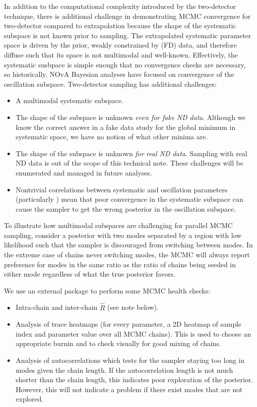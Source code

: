 \documentclass{article}
\begin{document}
In addition to the computational complexity introduced by the two-detector technique, there is additional challenge in demonstrating MCMC convergence for two-detector compared to extrapolation because the shape of the systematic subspace is not known prior to sampling. The extrapolated systematic parameter space is driven by the prior, weakly constrained by (FD) data, and therefore diffuse such that its space is not multimodal and well-known. Effectively, the systematic susbpace is simple enough that no convergence checks are necessary, so historically, NOvA Bayesian analyses have focused on convergence of the oscillation subspace. Two-detector sampling has additional challenges:
\begin{itemize}
  \item A multimodal systematic subspace.
  \item The shape of the subspace is unknown \textit{even for fake ND data}. Although we know the correct answer in a fake data study for the global minimum in systematic space, we have no notion of what other minima are.
  \item The shape of the subspace is unknown \textit{for real ND data}. Sampling with real ND data is out of the scope of this technical note. These challenges will be enumerated and managed in future analyses.
  \item Nontrivial correlations between systematic and oscillation parameters (particularly ) mean that poor convergence in the systematic subspace can cause the sampler to get the wrong posterior in the oscillation subspace.
\end{itemize}

To illustrate how multimodal subspaces are challenging for parallel MCMC sampling, consider a posterior with two modes separated by a region with low likelihood such that the sampler is discouraged from switching between modes. In the extreme case of chains never switching modes, the MCMC will always report preference for modes in the same ratio as the ratio of chains being seeded in either mode regardless of what the true posterior favors.

We use an external package \cite{ref:mcmc_diagnostics} to perform some MCMC health checks:
\begin{itemize}
  \item Intra-chain and inter-chain $\widehat{R}$ (see note below).
  \item Analysis of trace heatmaps (for every parameter, a 2D heatmap of sample index and parameter value over all MCMC chains). This is used to choose an appropriate burnin and to check visually for good mixing of chains.
  \item Analysis of autocorrelations which tests for the sampler staying too long in modes given the chain length. If the autocorrelation length is not much shorter than the chain length, this indicates poor exploration of the posterior. However, this will not indicate a problem if there exist modes that are not explored.
\end{itemize}
\end{document}
